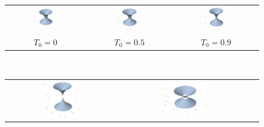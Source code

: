 \begin{figure}
\begin{center}
\begin{tabular}{ccc}
\includegraphics[width=0.33\textwidth]{max_flamm_paraboloid.png} &
\includegraphics[width=0.33\textwidth]{max_embedding_T0_05.png} &
\includegraphics[width=0.33\textwidth]{max_embedding_T0_09.png} \\
$T_0=0$ & $T_0=0.5$ & $T_0=0.9$
\end{tabular} \\
\begin{tabular}{ccc}
\includegraphics[width=0.33\textwidth]{max_embedding_T0_10.png} &
\includegraphics[width=0.33\textwidth]{max_embedding_T0_15.png} &

\end{tabular}
\end{center}
\end{figure}
